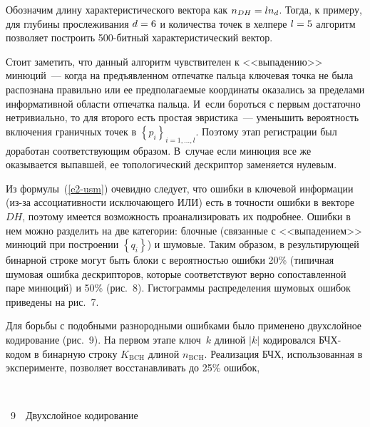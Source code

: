 \begin{multicols}{2}
      Обозначим длину характеристического вектора как $n_{DH}\hm = l n_d$. Тогда, к 
примеру, для глубины прослеживания $d \hm= 6$ и количества точек в хелпере $l \hm= 5$ 
алгоритм позволяет построить 500-бит\-ный характеристический вектор.
      

      
      Стоит заметить, что данный алгоритм чувствителен к <<выпадению>> 
      минюций~--- когда на предъявленном отпечатке пальца ключевая точка не была 
распознана правильно или ее предполагаемые координаты оказались за пределами 
информативной области отпечатка пальца. И~если бороться с первым достаточно 
нетривиально, то для второго есть простая эвристика~--- уменьшить вероятность 
включения граничных точек в $\left\{p_i\right\}_{i=1,\ldots ,l}$. Поэтому этап регистрации был 
доработан соответствующим образом. В~случае если минюция все же оказывается 
выпавшей, ее топологический дескриптор заменяется нулевым.
      
      Из формулы~(\ref{e2-usm}) очевидно следует, что ошибки в ключевой информации 
(из-за ассоциативности исключающего ИЛИ) есть в точности ошибки в векторе~$DH$, 
поэтому имеется возможность проанализировать их подробнее. Ошибки в нем можно 
разделить на две категории: блочные (связанные с <<выпадением>> минюций при 
построении $\left\{q_i\right\}$) и шумовые. Таким образом, в результирующей бинарной 
строке могут быть блоки с вероятностью ошибки 20\% (типичная шумовая ошибка 
дескрипторов, которые соответствуют верно сопоставленной паре минюций) и 50\% 
(рис.~8). Гистограммы распределения шумовых ошибок приведены на рис.~7.
      
      Для борьбы с подобными разнородными ошибками было применено двухслойное 
кодирование (рис.~9). На первом этапе ключ~$k$ длиной $\vert k\vert$ кодировался 
      БЧХ-ко\-дом в бинарную строку $K_{\mathrm{BCH}}$ длиной $n_{\mathrm{BCH}}$. Реализация БЧХ, 
использованная в эксперименте, позволяет восстанавливать до 25\% ошибок,\linebreak\vspace*{-12pt}

\begin{center} %
\vspace*{1pt}
\mbox{%
 \epsfxsize=78.207mm
}
\end{center}
\begin{center}
\vspace*{3pt}
{{\figurename~9}\ \ \small{Двухслойное кодирование}}
\end{center}


\end{multicols}
